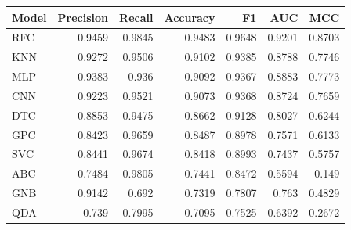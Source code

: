 \begin{tabular}{lrrrrrr}
\toprule
Model & Precision & Recall & Accuracy & F1 & AUC & MCC \\
\midrule
RFC & 0.9459 & 0.9845 & 0.9483 & 0.9648 & 0.9201 & 0.8703 \\
KNN & 0.9272 & 0.9506 & 0.9102 & 0.9385 & 0.8788 & 0.7746 \\
MLP & 0.9383 & 0.936 & 0.9092 & 0.9367 & 0.8883 & 0.7773 \\
CNN & 0.9223 & 0.9521 & 0.9073 & 0.9368 & 0.8724 & 0.7659 \\
DTC & 0.8853 & 0.9475 & 0.8662 & 0.9128 & 0.8027 & 0.6244 \\
GPC & 0.8423 & 0.9659 & 0.8487 & 0.8978 & 0.7571 & 0.6133 \\
SVC & 0.8441 & 0.9674 & 0.8418 & 0.8993 & 0.7437 & 0.5757 \\
ABC & 0.7484 & 0.9805 & 0.7441 & 0.8472 & 0.5594 & 0.149 \\
GNB & 0.9142 & 0.692 & 0.7319 & 0.7807 & 0.763 & 0.4829 \\
QDA & 0.739 & 0.7995 & 0.7095 & 0.7525 & 0.6392 & 0.2672 \\
\bottomrule
\end{tabular}
